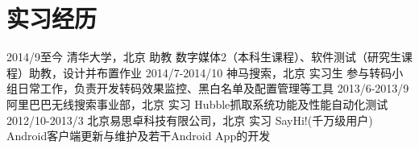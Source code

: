 \documentclass[]{friggeri-cv-cn}
\begin{document}


\section{实习经历}

\begin{entrylist}
  \entry
    {2014/9至今}
    {清华大学，北京}
    {助教}
    {数字媒体2（本科生课程）、软件测试（研究生课程）助教，设计并布置作业}
  \entry
    {2014/7-2014/10}
    {神马搜索，北京}
    {实习生}
    {参与转码小组日常工作，负责开发转码效果监控、黑白名单及配置管理等工具}
  \entry
    {2013/6-2013/9}
    {阿里巴巴无线搜索事业部，北京}
    {实习}
    {Hubble抓取系统功能及性能自动化测试}
  \entry
    {2012/10-2013/3}
    {北京易思卓科技有限公司，北京}
    {实习}
    {SayHi!(千万级用户) Android客户端更新与维护及若干Android App的开发}
\end{entrylist}
\end{document}
